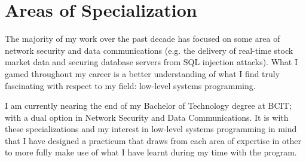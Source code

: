 \clearpage
\section{Areas of Specialization}
The majority of my work over the past decade has focused on some area of network security and data communications (e.g. the delivery of real-time stock market data and securing database servers from SQL injection attacks). What I gamed throughout my career is a better understanding of what I find truly fascinating with respect to my field: low-level systems programming.

I am currently nearing the end of my Bachelor of Technology degree at BCIT; with a dual option in Network Security and Data Communications. It is with these specializations and my interest in low-level systems programming in mind that I have designed a practicum that draws from each area of expertise in other to more fully make use of what I have learnt during my time with the program.